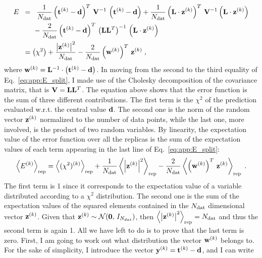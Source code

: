 \begin{equation}
    \begin{split}
        E \hspace{2mm} & = \hspace{2mm} \frac{1}{N_{\textrm{dat}}} \left( \mathbf{t}^{(k)} - \mathbf{d}\right)^T \, \mathbf{V}^{-1} \, \left( \mathbf{t}^{(k)} - \mathbf{d} \right) + \frac{1}{N_{\textrm{dat}}} \left( \mathbf{L} \cdot \mathbf{z}^{(k)} \right)^T \, \mathbf{V}^{-1} \left(  \mathbf{L} \cdot \mathbf{z}^{(k)} \right) \\
        & \hspace{5mm} - \frac{2}{N_{\textrm{dat}}} \left( \mathbf{t}^{(k)} - \mathbf{d} \right)^T \, \left(\mathbf{L} \mathbf{L}^{T} \right)^{-1} \, \left(\mathbf{L} \cdot \mathbf{z}^{(k)} \right) \\
        & = \left(\chi^2\right) + \frac{\left| \mathbf{z}^{(k)} \right|^2}{N_{\textrm{dat}}} - \frac{2}{N_{\textrm{dat}}} \left(\mathbf{w}^{(k)} \right)^T  \, \mathbf{z}^{(k)} \;,
    \end{split}
    \label{eq:app:E_split}
\end{equation}
%
where $\mathbf{w}^{(k)} = \mathbf{L}^{-1} \cdot \left( \mathbf{t}^{(k)} - \mathbf{d} \right)$. In moving from the second to the third equality of Eq.~\eqref{eq:app:E_split}, I made use of the Cholesky decomposition of the covariance matrix, that is $\mathbf{V} = \mathbf{L} \mathbf{L}^{T}$. The equation above shows that the error function is the sum of three different contributions. The first term is the $\chi^2$ of the prediction evaluated w.r.t. the central value $\mathbf{d}$. The second one is the norm of the random vector $\mathbf{z}^{(k)}$ normalized to the number of data points, while the last one, more involved, is the product of two random variables. By linearity, the expectation value of the error function over all the replicas is the sum of the expectation values of each term appearing in the last line of Eq.~\eqref{eq:app:E_split}:
\begin{equation}
    \left< E^{(k)} \right>_{\textrm{rep}} = \left<(\chi^2)^{(k)}\right>_{\textrm{rep}} + \frac{1}{N_{\textrm{dat}}} \left< \left| \mathbf{z}^{(k)} \right|^2 \right>_{\textrm{rep}} - \frac{2}{N_{\textrm{dat}}} \left<\left(\mathbf{w}^{(k)}\right)^T  \, \mathbf{z}^{(k)}\right>_{\textrm{rep}} \;.
    \label{eq:app:exp_E_split}
\end{equation}
The first term is 1 since it corresponds to the expectation value of a variable distributed according to a $\chi^2$ distribution. The second one is the sum of the expectation values of the squared elements contained in the $N_{\textrm{dat}}$ dimensional vector $\mathbf{z}^{(k)}$. Given that $\mathbf{z}^{(k)} \sim \mathcal{N}(\mathbf{0},\, I_{N_{dat}})$, then $\left< \left| \mathbf{z}^{(k)} \right|^2 \right>_{\textrm{rep}} = N_{\textrm{dat}}$ and thus the second term is again 1. All we have left to do is to prove that the last term is zero. First, I am going to work out what distribution the vector $\mathbf{w}^{(k)}$ belongs to. For the sake of simplicity, I introduce the vector $\mathbf{y}^{(k)} = \mathbf{t}^{(k)} - \mathbf{d}$, and I can write
